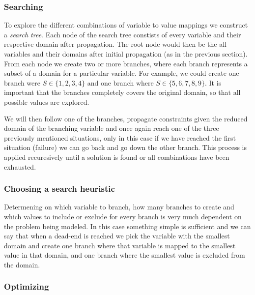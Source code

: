 \subsubsection{Searching}

To explore the different combinations of variable to value mappings we construct a \textit{
search tree}. Each node of the search tree constists of every variable and their respective
domain after propagation. The root node would then be the all variables and their domains
after initial propagation (as in the previous section). From each node we create two or
more branches, where each branch represents a subset of a domain for a particular variable.
For example, we could create one branch were $S \in \{1, 2, 3, 4\}$ and one branch where $S \in 
\{5, 6, 7, 8, 9\}$. It is important that the branches completely covers the original
domain, so that all possible values are explored.

We will then follow one of the branches, propagate constraints given the reduced domain
of the branching variable and once again reach one of the three previously mentioned
situations, only in this case if we have reached the first situation (failure) we can go
back and go down the other branch. This process is applied recuresively until a solution
is found or all combinations have been exhausted.

\subsubsection{Choosing a search heuristic}

Determening on which variable to branch, how many branches to create and which values to
include or exclude for every branch is very much dependent on the problem being modeled.
In this case something simple is sufficient and we can say that when a dead-end is reached
we pick the variable with the smallest domain and create one branch where that variable
is mapped to the smallest value in that domain, and one branch where the smallest value
is excluded from the domain.




\subsubsection{Optimizing}

